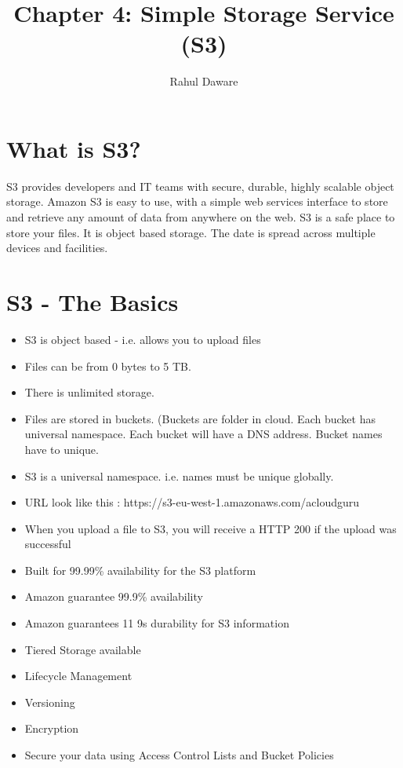 \documentclass{article}
\author{Rahul Daware}
\begin{document}
\title{Chapter 4: Simple Storage Service (S3)}
\maketitle
\tableofcontents
\newpage

\section{What is S3?}
S3 provides developers and IT teams with secure, durable, highly scalable object storage. Amazon S3 is easy to use, with a simple web services interface to store and retrieve any amount of data from anywhere on the web. S3 is a safe place to store your files. It is object based storage. The date is spread across multiple devices and facilities.

\section{S3 - The Basics}
\begin{itemize}
\item
S3 is object based - i.e. allows you to upload files

\item
Files can be from 0 bytes to 5 TB.

\item
There is unlimited storage.

\item
Files are stored in buckets. (Buckets are folder in cloud. Each bucket has universal namespace. Each bucket will have a DNS address. Bucket names have to unique.

\item
S3 is a universal namespace. i.e. names must be unique globally.

\item
URL look like this : https://s3-eu-west-1.amazonaws.com/acloudguru

\item
When you upload a file to S3, you will receive a HTTP 200 if the upload was successful

\item
Built for 99.99\% availability for the S3 platform

\item
Amazon guarantee 99.9\% availability

\item
Amazon guarantees 11 9s durability for S3 information

\item
Tiered Storage available

\item
Lifecycle Management

\item
Versioning

\item
Encryption

\item
Secure your data using Access Control Lists and Bucket Policies

\end{itemize}
\end{document}
